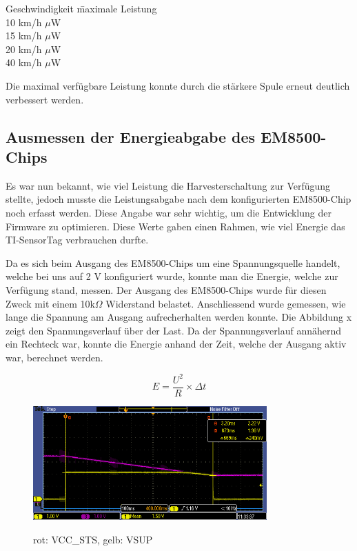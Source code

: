 \begin{tabbing}
    Geschwindigkeit   	\quad\= maximale Leistung    \\[0.8ex]
    10 km/h		         $\mu$W\\
	15 km/h		         $\mu$W\\
	20 km/h		         $\mu$W\\
	40 km/h		         $\mu$W\\
\end{tabbing}

Die maximal verfügbare Leistung konnte durch die stärkere Spule erneut deutlich verbessert werden. 

\subsection{Ausmessen der Energieabgabe des EM8500-Chips}

Es war nun bekannt, wie viel Leistung die Harvesterschaltung zur Verfügung stellte, jedoch musste die Leistungsabgabe nach dem konfigurierten EM8500-Chip noch erfasst werden. Diese Angabe war sehr wichtig, um die Entwicklung der Firmware zu optimieren. Diese Werte gaben einen Rahmen, wie viel Energie das TI-SensorTag verbrauchen durfte.

Da es sich beim Ausgang des EM8500-Chips um eine Spannungsquelle handelt, welche bei uns auf 2 V konfiguriert wurde, konnte man die Energie, welche zur Verfügung stand, messen. Der Ausgang des EM8500-Chips wurde für diesen Zweck mit einem 10k$\Omega$ Widerstand belastet. Anschliessend wurde gemessen, wie lange die Spannung am Ausgang aufrecherhalten werden konnte. Die Abbildung x zeigt den Spannungsverlauf über der Last. Da der Spannungsverlauf annähernd ein Rechteck war, konnte die Energie anhand der Zeit, welche der Ausgang aktiv war, berechnet werden.

\begin{equation}
	E = \frac{U^2}{R}  \times \Delta t
\end{equation}

\begin{figure}[ht]
  \includegraphics[width=0.80\textwidth]{3Vorgehen/imag/EnergieEMChip15kmh.PNG}
  \label{EnergieEMChip15kmh} 
  \caption{rot: VCC\_STS, gelb: VSUP}
\end{figure}



